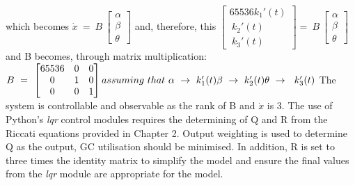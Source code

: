 which becomes
\newline\newline
\begin{math}
\dot{x} \ =\ B\ \begin{bmatrix}
\alpha \\
\beta \\
\theta 
\end{bmatrix}
\end{math}
\newline\newline
and, therefore, this
\newline\newline
\begin{math}
\begin{bmatrix}
65536k_{1} '( t)\\
\ k_{2} '( t)\\
\ k_{3} '( t)
\end{bmatrix} =\ B\ \begin{bmatrix}
\alpha \\
\beta \\
\theta 
\end{bmatrix}
\end{math}
\newline\newline
and B becomes, through matrix multiplication:
\newline\newline
\begin{math}
B\ =\ \begin{bmatrix}
65536 & 0 & 0\\
0 & 1 & 0\\
0 & 0 & 1
\end{bmatrix}\\
\\
assuming\ that\ \alpha \ \rightarrow \ k_{1} '( t)\\
\beta \ \rightarrow \ k_{2} '( t)\\
\theta \ \rightarrow \ \ k_{3} '( t)
\end{math}
\newline\newline 
The system is controllable and observable as the rank of B and \begin{math} \dot{x} \end{math} is 3. 
\newline\newline
The use of Python's \emph{lqr} control modules requires the determining of Q and R from the Riccati equations provided in Chapter 2. Output weighting is used to determine Q as the output, GC utilisation should be minimised. In addition, R is set to three times the identity matrix to simplify the model and ensure the final values from the \emph{lqr} module are appropriate for the model. 
